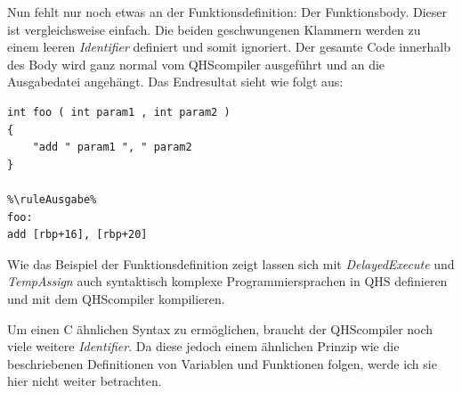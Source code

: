 Nun fehlt nur noch etwas an der Funktionsdefinition: Der Funktionsbody. Dieser ist vergleichsweise einfach. Die beiden geschwungenen Klammern werden zu einem leeren \textit{Identifier} definiert und somit ignoriert.
Der gesamte Code innerhalb des Body wird ganz normal vom QHScompiler ausgeführt und an die Ausgabedatei angehängt. Das Endresultat sieht wie folgt aus:

\begin{lstlisting}[language=QHS, caption=Finale Definition einer Funktion in QHS]
%\ruleEingabe%
int foo ( int param1 , int param2 )
{
    "add " param1 ", " param2
}

%\ruleAusgabe%
foo:
add [rbp+16], [rbp+20]
\end{lstlisting}

Wie das Beispiel der Funktionsdefinition zeigt lassen sich mit \textit{DelayedExecute} und \textit{TempAssign} auch syntaktisch komplexe Programmiersprachen in QHS definieren und mit dem QHScompiler kompilieren.

Um einen C ähnlichen Syntax zu ermöglichen, braucht der QHScompiler noch viele weitere \textit{Identifier}.
Da diese jedoch einem ähnlichen Prinzip wie die beschriebenen Definitionen von Variablen und Funktionen folgen, werde ich sie hier nicht weiter betrachten.


    







